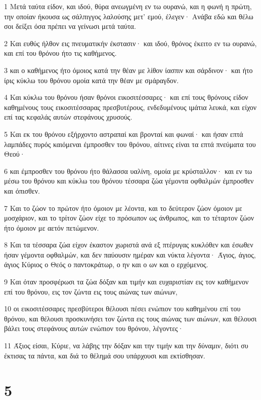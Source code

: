 \par 1 Μετά ταύτα είδον, και ιδού, θύρα ανεωγμένη εν τω ουρανώ, και η φωνή η πρώτη, την οποίαν ήκουσα ως σάλπιγγος λαλούσης μετ' εμού, έλεγεν· Ανάβα εδώ και θέλω σοι δείξει όσα πρέπει να γείνωσι μετά ταύτα.
\par 2 Και ευθύς ήλθον εις πνευματικήν έκστασιν· και ιδού, θρόνος έκειτο εν τω ουρανώ, και επί του θρόνου ήτο τις καθήμενος.
\par 3 και ο καθήμενος ήτο όμοιος κατά την θέαν με λίθον ίασπιν και σάρδινον· και ήτο ίρις κύκλω του θρόνου ομοία κατά την θέαν με σμάραγδον.
\par 4 Και κύκλω του θρόνου ήσαν θρόνοι εικοσιτέσσαρες· και επί τους θρόνους είδον καθημένους τους εικοσιτέσσαρας πρεσβυτέρους, ενδεδυμένους ιμάτια λευκά, και είχον επί τας κεφαλάς αυτών στεφάνους χρυσούς.
\par 5 Και εκ του θρόνου εξήρχοντο αστραπαί και βρονταί και φωναί· και ήσαν επτά λαμπάδες πυρός καιόμεναι έμπροσθεν του θρόνου, αίτινες είναι τα επτά πνεύματα του Θεού·
\par 6 και έμπροσθεν του θρόνου ήτο θάλασσα υαλίνη, ομοία με κρύσταλλον· και εν τω μέσω του θρόνου και κύκλω του θρόνου τέσσαρα ζώα γέμοντα οφθαλμών έμπροσθεν και όπισθεν.
\par 7 Και το ζώον το πρώτον ήτο όμοιον με λέοντα, και το δεύτερον ζώον όμοιον με μοσχάριον, και το τρίτον ζώον είχε το πρόσωπον ως άνθρωπος, και το τέταρτον ζώον ήτο όμοιον με αετόν πετώμενον.
\par 8 Και τα τέσσαρα ζώα είχον έκαστον χωριστά ανά εξ πτέρυγας κυκλόθεν και έσωθεν ήσαν γέμοντα οφθαλμών, και δεν παύουσιν ημέραν και νύκτα λέγοντα· Άγιος, άγιος, άγιος Κύριος ο Θεός ο παντοκράτωρ, ο ην και ο ων και ο ερχόμενος.
\par 9 Και όταν προσφέρωσι τα ζώα δόξαν και τιμήν και ευχαριστίαν εις τον καθήμενον επί του θρόνου, εις τον ζώντα εις τους αιώνας των αιώνων,
\par 10 οι εικοσιτέσσαρες πρεσβύτεροι θέλουσι πέσει ενώπιον του καθημένου επί του θρόνου, και θέλουσι προσκυνήσει τον ζώντα εις τους αιώνας των αιώνων, και θέλουσι βάλει τους στεφάνους αυτών ενώπιον του θρόνου, λέγοντες·
\par 11 Άξιος είσαι, Κύριε, να λάβης την δόξαν και την τιμήν και την δύναμιν, διότι συ έκτισας τα πάντα, και διά το θέλημά σου υπάρχουσι και εκτίσθησαν.

\chapter{5}

